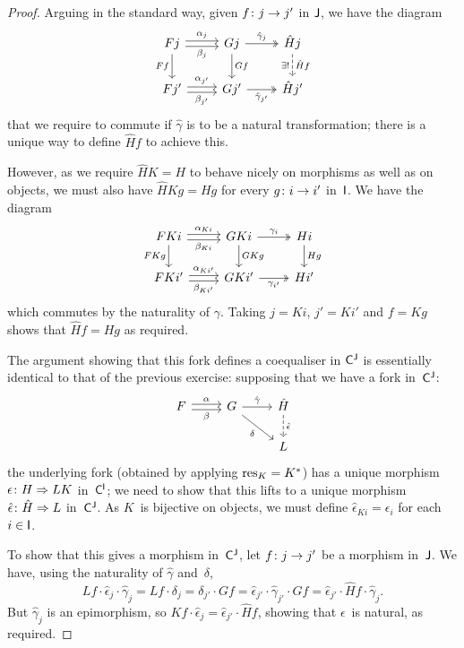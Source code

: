 \documentclass[../../solutions]{subfiles}
\begin{document}
\begin{proof}
  Arguing in the standard way, given ${f}\colon{j}\to{j'}$ in ${\mathsf{J}}$, we
  have the diagram
  $$
  \begin{tikzcd}
    Fj
    \ar[r, shift left=0.5ex, "\alpha_j"]
    \ar[r, shift right=0.5ex, "\beta_j"']
    \ar[d, "Ff"']
    & Gj
    \ar[r, twoheadrightarrow, "\hat\gamma_j"]
    \ar[d, "Gf"]
    & \hat Hj
    \ar[d, dashed, "\exists!\vphantom{\hat Hf}"', "\hat Hf"]
    \\
    Fj'
    \ar[r, shift left=0.5ex, "\alpha_{j'}"]
    \ar[r, shift right=0.5ex, "\beta_{j'}"']
    & Gj'
    \ar[r, twoheadrightarrow, "\hat\gamma_{j'}"']
    & \hat Hj'
  \end{tikzcd}
  $$
  that we require to commute if $\hat\gamma$ is to be a natural
  transformation; there is a unique way to define $\hat Hf$ to achieve
  this.

  However, as we require $\hat HK=H$ to behave nicely on morphisms as
  well as on objects, we must also have $\hat HKg=Hg$ for every
  ${g}\colon{i}\to{i'}$ in~${\mathsf{I}}$.  We have the diagram
  $$
  \begin{tikzcd}
    FKi
    \ar[r, shift left=0.5ex, "\alpha_{Ki}"]
    \ar[r, shift right=0.5ex, "\beta_{Ki}"']
    \ar[d, "FKg"']
    & GKi
    \ar[r, twoheadrightarrow, "\gamma_i"]
    \ar[d, "GKg"]
    & Hi
    \ar[d, "Hg"]
    \\
    FKi'
    \ar[r, shift left=0.5ex, "\alpha_{Ki'}"]
    \ar[r, shift right=0.5ex, "\beta_{Ki'}"']
    & GKi'
    \ar[r, twoheadrightarrow, "\gamma_{i'}"']
    & Hi'
  \end{tikzcd}
  $$
  which commutes by the naturality of $\gamma$.  Taking $j=Ki$,
  $j'=Ki'$ and $f=Kg$ shows that $\hat Hf=Hg$ as required.

  The argument showing that this fork defines a coequaliser in
  ${\mathsf{C}}^{\mathsf{J}}$ is essentially identical to that of the previous exercise:
  supposing that we have a fork in~${\mathsf{C}}^{\mathsf{J}}$:
  $$
  \begin{tikzcd}
    F
    \ar[r, shift left=0.5ex, "\alpha"]
    \ar[r, shift right=0.5ex, "\beta"']
    & G
    \ar[r, "\hat\gamma"]
    \ar[dr, "\delta"']
    & \hat H
    \ar[d, dashed, "\hat\epsilon"]
    \\
    && L
  \end{tikzcd}
  $$
  the underlying fork (obtained by applying $\operatorname{res}_K=K^*$) has a unique
  morphism ${\epsilon}\colon{H}\Rightarrow{LK}$ in~${\mathsf{C}}^{\mathsf{I}}$; we need to show that
  this lifts to a unique morphism ${\hat\epsilon}\colon{\hat H}\Rightarrow{L}$
  in~${\mathsf{C}}^{\mathsf{J}}$.  As $K$~is bijective on objects, we must define
  $\hat\epsilon_{Ki}=\epsilon_i$ for each $i\in{\mathsf{I}}$.

  To show that this gives a morphism in~${\mathsf{C}}^{\mathsf{J}}$, let
  ${f}\colon{j}\to{j'}$ be a morphism in~${\mathsf{J}}$.  We have, using the
  naturality of $\hat\gamma$ and~$\delta$,
  $$Lf\cdot \hat\epsilon_j \cdot \hat\gamma_j = Lf\cdot \delta_j =
  \delta_{j'}\cdot Gf = \hat\epsilon_{j'} \cdot \hat\gamma_{j'} \cdot
  Gf = \hat\epsilon_{j'} \cdot \hat Hf \cdot \hat\gamma_j.$$
  But $\hat\gamma_j$ is an epimorphism, so
  $Kf\cdot \hat\epsilon_j = \hat\epsilon_{j'}\cdot \hat Hf$, showing
  that $\epsilon$~is natural, as required.
\end{proof}
\end{document}
